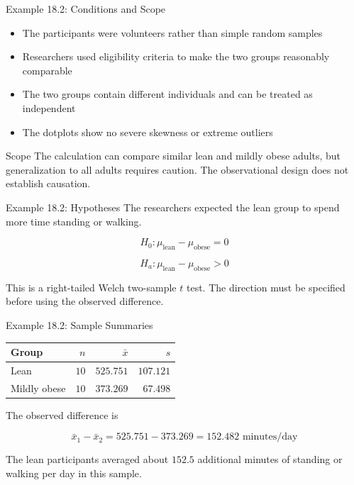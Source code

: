 \documentclass[aspectratio=169,10pt]{beamer}
\begin{document}
\begin{frame}{Example 18.2: Conditions and Scope}
\begin{itemize}
  \item The participants were volunteers rather than simple random samples
  \item Researchers used eligibility criteria to make the two groups reasonably comparable
  \item The two groups contain different individuals and can be treated as independent
  \item The dotplots show no severe skewness or extreme outliers
\end{itemize}

\begin{block}{Scope}
The calculation can compare similar lean and mildly obese adults, but generalization to all adults requires caution. The observational design does not establish causation.
\end{block}
\end{frame}

\begin{frame}{Example 18.2: Hypotheses}
The researchers expected the lean group to spend more time standing or walking.

\[
H_0:\mu_{\text{lean}}-\mu_{\text{obese}}=0
\]

\[
H_a:\mu_{\text{lean}}-\mu_{\text{obese}}>0
\]

This is a right-tailed Welch two-sample $t$ test. The direction must be specified before using the observed difference.
\end{frame}

\begin{frame}{Example 18.2: Sample Summaries}
\begin{center}
\begin{tabular}{lrrr}
\toprule
\textbf{Group} & $n$ & $\bar{x}$ & $s$ \\
\midrule
Lean & $10$ & $525.751$ & $107.121$ \\
Mildly obese & $10$ & $373.269$ & $67.498$ \\
\bottomrule
\end{tabular}
\end{center}

The observed difference is

\[
\bar{x}_1-\bar{x}_2
=525.751-373.269
=152.482\text{ minutes/day}
\]

The lean participants averaged about $152.5$ additional minutes of standing or walking per day in this sample.
\end{frame}
\end{document}
